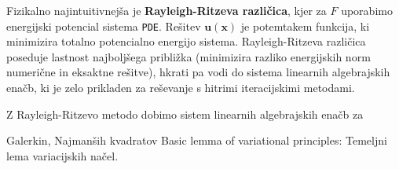Fizikalno najintuitivnejša je \textbf{Rayleigh-Ritzeva različica}, kjer za $F$ uporabimo energijski potencial sistema \texttt{PDE}. Rešitev $\mathbf{u}(\mathbf{x})$ je potemtakem funkcija, ki minimizira totalno potencialno energijo sistema. Rayleigh-Ritzeva različica poseduje lastnost najboljšega približka (minimizira razliko energijskih norm numerične in eksaktne rešitve), hkrati pa vodi do sistema linearnih algebrajskih enačb, ki je zelo prikladen za reševanje s hitrimi iteracijskimi metodami.

Z Rayleigh-Ritzevo metodo dobimo sistem linearnih algebrajskih enačb za 

Galerkin, Najmanših kvadratov \cite{JiangB-LSFEM}
Basic lemma of variational principles: Temeljni lema variacijskih načel.